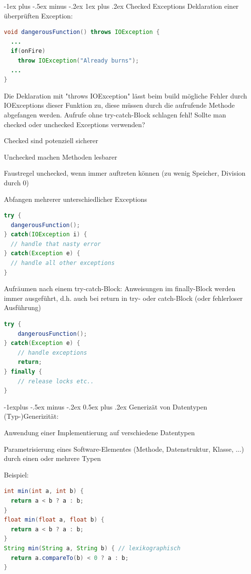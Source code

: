 \documentclass[10pt]{article}
\makeatletter
\renewcommand{\subsection}{\@startsection{subsection}{2}{0mm}%
                                {-1explus -.5ex minus -.2ex}%
                                {0.5ex plus .2ex}%
                                {\normalfont\normalsize\bfseries}}
\renewcommand{\subsubsection}{\@startsection{subsubsection}{3}{0mm}%
                                {-1ex plus -.5ex minus -.2ex}%
                                {1ex plus .2ex}%
                                {\normalfont\small\bfseries}}
\makeatother
\begin{document}
\subsubsection{Checked Exceptions}
Deklaration einer überprüften Exception:
\begin{lstlisting}[language=java]
void dangerousFunction() throws IOException {
  ...
  if(onFire)
    throw IOException("Already burns");
  ...
}
\end{lstlisting}

Die Deklaration mit "throws IOException" lässt beim build mögliche Fehler durch IOExceptions dieser Funktion zu, diese müssen durch die aufrufende Methode abgefangen werden.
Aufrufe ohne try-catch-Block schlagen fehl!
Sollte man checked oder unchecked Exceptions verwenden?
\begin{itemize*}
  \item Checked sind potenziell sicherer
  \item Unchecked machen Methoden lesbarer
  \item Faustregel unchecked, wenn immer auftreten können (zu wenig Speicher, Division durch 0)
\end{itemize*}

Abfangen mehrerer unterschiedlicher Exceptions
\begin{lstlisting}[language=java]
try {
  dangerousFunction();
} catch(IOException i) {
  // handle that nasty error
} catch(Exception e) {
  // handle all other exceptions
}
\end{lstlisting}

Aufräumen nach einem try-catch-Block: Anweisungen im finally-Block werden immer ausgeführt, d.h. auch bei
return in try- oder catch-Block (oder fehlerloser Ausführung)
\begin{lstlisting}[language=java]
try {
    dangerousFunction();
} catch(Exception e) {
    // handle exceptions
    return;
} finally {
    // release locks etc..
}
\end{lstlisting}

\subsection{Generizät von Datentypen}
(Typ-)Generizität:
\begin{itemize*}
  \item Anwendung einer Implementierung auf verschiedene Datentypen
  \item Parametrisierung eines Software-Elementes (Methode, Datenstruktur, Klasse, ...) durch einen oder mehrere Typen
\end{itemize*}
Beispiel:
\begin{lstlisting}[language=java]
int min(int a, int b) {
  return a < b ? a : b;
}
float min(float a, float b) {
  return a < b ? a : b;
}
String min(String a, String b) { // lexikographisch
  return a.compareTo(b) < 0 ? a : b;
}
\end{lstlisting}
\end{document}
